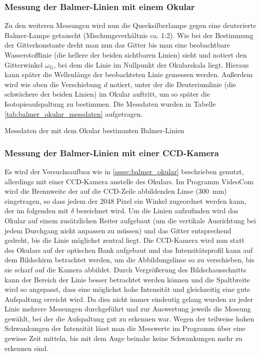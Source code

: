 \documentclass[11pt, a4paper]{article}
\numberwithin{equation}{section}
\begin{document}
\subsubsection{Messung der Balmer-Linien mit einem Okular} 
Zu den weiteren Messungen wird nun die Quecksilberlampe gegen eine deuterierte Balmer-Lampe getauscht (Mischungsverhältnis ca. 1:2).
Wie bei der Bestimmung der Gitterkonstante dreht man nun das Gitter bis man eine beobachtbare Wasserstofflinie (die hellere der beiden sichtbaren Linien) sieht und notiert den Gitterwinkel $\omega_\text{G}$, bei dem die Linie im Nullpunkt der Okularskala liegt.
Hieraus kann später die Wellenlänge der beobachteten Linie gemessen werden.
Außerdem wird wie oben die Verschiebung $d$ notiert, unter der die Deuteriumlinie (die schwächere der beiden Linien) im Okular auftritt, um so später die Isotopieaufspaltung zu bestimmen.
Die Messdaten wurden in Tabelle \ref{tab:balmer_okular_messdaten} aufgetragen.
\begin{table}[h]
	\centering
	
	\caption{Messdaten der mit dem Okular bestimmten Balmer-Linien}
	\label{tab:balmer_okular_messdaten}
\end{table}

\subsubsection{Messung der Balmer-Linien mit einer CCD-Kamera}
Es wird der Versuchsaufbau wie in \ref{sssec:balmer_okular} beschrieben genutzt, allerdings mit einer CCD-Kamera anstelle des Okulars. 
Im Programm VideoCom wird die Brennweite der auf die CCD-Zeile abbildenden Linse (\SI{300}{\milli\meter}) eingetragen, so dass jedem der 2048 Pixel ein Winkel zugeordnet werden kann, der im folgenden mit $\delta$ bezeichnet wird.
Um die Linien aufzufinden wird das Okular auf einem zusätzlichen Reiter aufgebaut (um die vertikale Ausrichtung bei jedem Durchgang nicht anpassen zu müssen) und das Gitter entsprechend gedreht, bis die Linie möglichst zentral liegt.
Die CCD-Kamera wird nun statt des Okulars auf der optischen Bank aufgebaut und das Intensitätsprofil kann auf dem Bildschirm betrachtet werden, um die Abbildungslinse so zu verschieben, bis sie scharf auf die Kamera abbildet.
Durch Vergrößerung des Bildschausschnitts kann der Bereich der Linie besser betrachtet werden können und die Spaltbreite wird so angepasst, dass eine möglichst hohe Intensität und gleichzeitig eine gute Aufspaltung erreicht wird.
Da dies nicht immer eindeutig gelang wurden zu jeder Linie mehrere Messungen durchgeführt und zur Auswertung jeweils die Messung gewählt, bei der die Aufspaltung gut zu erkennen war.
Wegen der teilweise hohen Schwankungen der Intensität lässt man die Messwerte im Programm über eine gewisse Zeit mitteln, bis mit dem Auge beinahe keine Schwankungen mehr zu erkennen sind.
\end{document}
